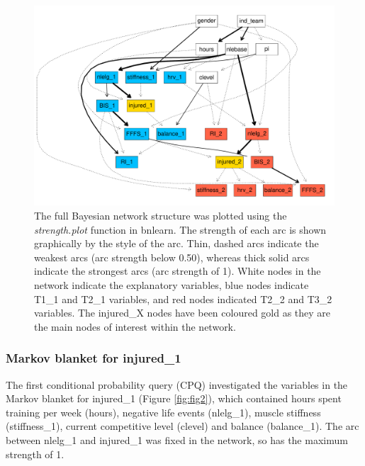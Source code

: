 \documentclass[
  english,
  man]{apa6}
\begin{document}
\begin{figure}
\centering
\includegraphics{manuscript_files/figure-latex/fig1-1.pdf}
\caption{\label{fig:fig1}The full Bayesian network structure was plotted using the \emph{strength.plot} function in bnlearn. The strength of each arc is shown graphically by the style of the arc. Thin, dashed arcs indicate the weakest arcs (arc strength below 0.50), whereas thick solid arcs indicate the strongest arcs (arc strength of 1). White nodes in the network indicate the explanatory variables, blue nodes indicate T1\_1 and T2\_1 variables, and red nodes indicated T2\_2 and T3\_2 variables. The injured\_X nodes have been coloured gold as they are the main nodes of interest within the network.}
\end{figure}

\hypertarget{markov-blanket-for-injured_1}{%
\subsubsection{Markov blanket for injured\_1}\label{markov-blanket-for-injured_1}}

The first conditional probability query (CPQ) investigated the variables in the Markov blanket for injured\_1 (Figure \ref{fig:fig2}), which contained hours spent training per week (hours), negative life events (nlelg\_1), muscle stiffness (stiffness\_1), current competitive level (clevel) and balance (balance\_1).
The arc between nlelg\_1 and injured\_1 was fixed in the network, so has the maximum strength of 1.
\end{document}
